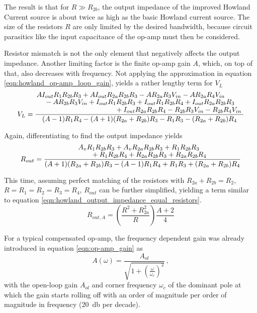 \documentclass[12pt]{book}
\begin{document}
The result is that for $R \gg R_{2b}$, the output impedance of the improved Howland Current source is about twice as high as the basic Howland current source. The size of the resistors $R$ are only limited by the desired bandwidth, because circuit parasitics like the input capacitance of the op-amp must then be considered.

Resistor mismatch is not the only element that negatively affects the output impedance. Another limiting factor is the finite op-amp gain $A$, which, on top of that, also decreases with frequency. Not applying the approximation in equation \ref{eqn:howland_op-amp_loop_gain}, yields a rather lengthy term for $V_L$
\begin{equation}
    V_L = \frac{\splitfrac{A I_{out} R_1 R_{2b} R_3 + A I_{out} R_{2a} R_{2b} R_3 - A R_{2a} R_3 V_{in} - A R_{2a} R_4 V_{in}}{\splitfrac{\mathstrut- A R_{2b} R_3 V_{in} + I_{out} R_1 R_{2b} R_3 + I_{out} R_1 R_{2b} R_4 + I_{out} R_{2a} R_{2b} R_3}{+ I_{out} R_{2a} R_{2b} R_4 - R_{2b} R_3 V_{in} - R_{2b} R_4 V_{in}}}}{(A-1) R_1 R_4 - (A + 1) (R_{2a} + R_{2b}) R_3 - R_1 R_3 - (R_{2a} + R_{2b}) R_4}
\end{equation}

Again, differentiating to find the output impedance yields
\begin{equation}
    R_{out} = \frac{\splitfrac{A_{v} R_{1} R_{2b} R_{3} + A_{v} R_{2a} R_{2b} R_{3} + R_{1} R_{2b} R_{3}}{+ R_{1} R_{2b} R_{4} + R_{2a} R_{2b} R_{3} + R_{2a} R_{2b} R_{4}}}{(A + 1) (R_{2a} + R_{2b}) R_3 -(A-1) R_1 R_4 + R_1 R_3 + (R_{2a} + R_{2b}) R_4}
\end{equation}

This time, assuming perfect matching of the resistors with $R_{2a} + R_{2b} = R_2$, $R = R_1 = R_2 = R_3 = R_4$, $R_{out}$ can be further simplified, yielding a term similar to equation \ref{eqn:howland_output_impedance_equal_resistors}.
\begin{equation}
    R_{out,A} = \left(\frac{R^2+R_{2a}^2}{R}\right) \frac{A + 2}{4} \label{eqn:howland_output_impedance_loop_gain}
\end{equation}

For a typical compensated op-amp, the frequency dependent gain was already introduced in equation \ref{eqn:op-amp_gain} as
\begin{equation*}
    A (\omega) = \frac{A_{ol}}{\sqrt{1 + \left(\frac{\omega}{\omega_c}\right)^2}}\,,
\end{equation*}
with the open-loop gain $A_{ol}$ and corner frequency $\omega_c$ of the dominant pole at which the gain starts rolling off with an order of magnitude per order of magnitude in frequency (\qty{20}{\decibel} per decade).
\end{document}
